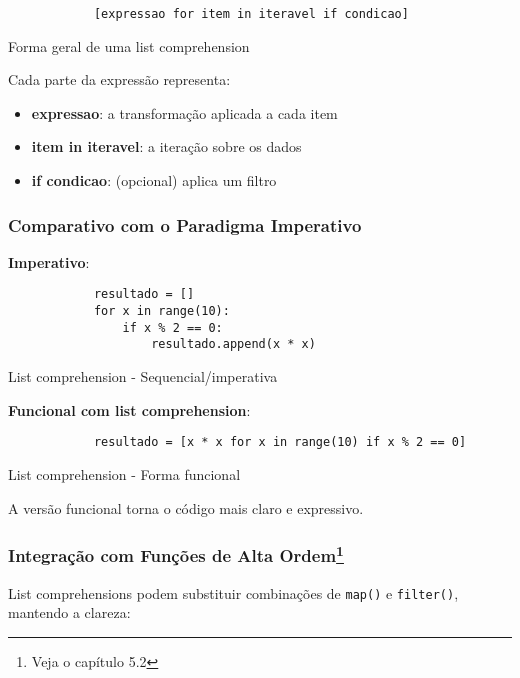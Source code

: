 \documentclass[date,twocolumn,a4paper]{ppgem}
\begin{document}
    \begin{listing}[!ht]
        \begin{verbatim}
            [expressao for item in iteravel if condicao]
        \end{verbatim}
        \caption{Forma geral de uma list comprehension}
        \label{listing:2}
    \end{listing}

    Cada parte da expressão representa:
    \begin{itemize}
        \item \textbf{expressao}: a transformação aplicada a cada item
        \item \textbf{item in iteravel}: a iteração sobre os dados
        \item \textbf{if condicao}: (opcional) aplica um filtro
    \end{itemize}

    \subsubsection{Comparativo com o Paradigma Imperativo}
    \textbf{Imperativo}:

    \begin{listing}[!ht]
        \begin{verbatim}
            resultado = []
            for x in range(10):
                if x % 2 == 0:
                    resultado.append(x * x)
        \end{verbatim}
        \caption{List comprehension - Sequencial/imperativa}
        \label{listing:2}
    \end{listing}
    \textbf{Funcional com list comprehension}:
    \begin{listing}[!ht]
        \begin{verbatim}
            resultado = [x * x for x in range(10) if x % 2 == 0]
        \end{verbatim}
        \caption{List comprehension - Forma funcional}
        \label{listing:2}
    \end{listing}

    A versão funcional torna o código mais claro e expressivo.
    \subsubsection{Integração com Funções de Alta Ordem\footnote{Veja o capítulo 5.2}}
    List comprehensions podem substituir combinações de \texttt{map()} e \texttt{filter()}, mantendo a clareza:
\end{document}
